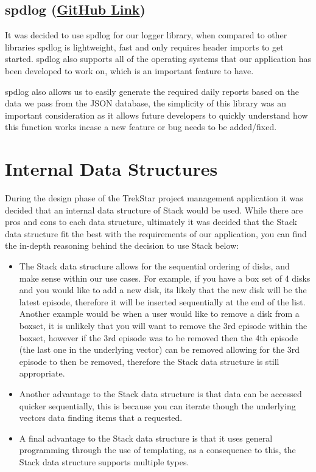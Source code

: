 \documentclass[
  english,
  a4paper,
,tablecaptionabove
]{scrartcl}
\providecommand{\tightlist}{%
  \setlength{\itemsep}{0pt}\setlength{\parskip}{0pt}}
\begin{document}
\hypertarget{spdlog-github-link}{%
\subsection{\texorpdfstring{spdlog
(\href{https://github.com/gabime/spdlog}{GitHub
Link})}{spdlog (GitHub Link)}}\label{spdlog-github-link}}

It was decided to use spdlog for our logger library, when compared to
other libraries spdlog is lightweight, fast and only requires header
imports to get started. spdlog also supports all of the operating
systems that our application has been developed to work on, which is an
important feature to have.

spdlog also allows us to easily generate the required daily reports
based on the data we pass from the JSON database, the simplicity of this
library was an important consideration as it allows future developers to
quickly understand how this function works incase a new feature or bug
needs to be added/fixed.

\newpage

\hypertarget{internal-data-structures}{%
\section{Internal Data Structures}\label{internal-data-structures}}

During the design phase of the TrekStar project management application
it was decided that an internal data structure of Stack would be used.
While there are pros and cons to each data structure, ultimately it was
decided that the Stack data structure fit the best with the requirements
of our application, you can find the in-depth reasoning behind the
decision to use Stack below:

\begin{itemize}
\tightlist
\item
  The Stack data structure allows for the sequential ordering of disks,
  and make sense within our use cases. For example, if you have a box
  set of 4 disks and you would like to add a new disk, its likely that
  the new disk will be the latest episode, therefore it will be inserted
  sequentially at the end of the list. Another example would be when a
  user would like to remove a disk from a boxset, it is unlikely that
  you will want to remove the 3rd episode within the boxset, however if
  the 3rd episode was to be removed then the 4th episode (the last one
  in the underlying vector) can be removed allowing for the 3rd episode
  to then be removed, therefore the Stack data structure is still
  appropriate.
\item
  Another advantage to the Stack data structure is that data can be
  accessed quicker sequentially, this is because you can iterate though
  the underlying vectors data finding items that a requested.
\item
  A final advantage to the Stack data structure is that it uses general
  programming through the use of templating, as a consequence to this,
  the Stack data structure supports multiple types.
\end{itemize}
\end{document}
